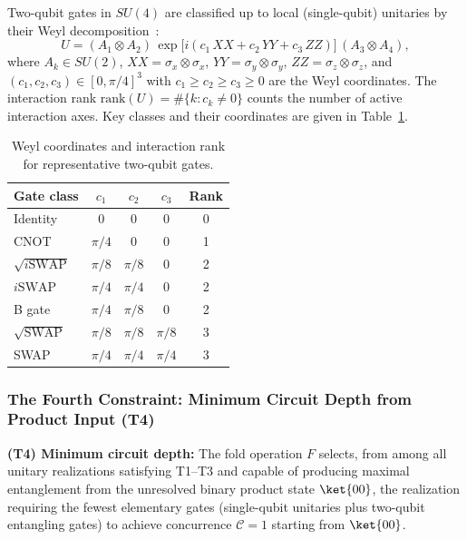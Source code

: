 Two-qubit gates in $SU(4)$ are classified up to local (single-qubit)
unitaries by their Weyl decomposition~\cite{Zhang2003}:
\begin{equation}
    U = (A_1 \otimes A_2)\,
        \exp\!\bigl[i(c_1\,XX + c_2\,YY + c_3\,ZZ)\bigr]\,
        (A_3 \otimes A_4),
    \label{eq:weyl_decomp}
\end{equation}
where $A_k \in SU(2)$, $XX = \sigma_x\otimes\sigma_x$,
$YY = \sigma_y\otimes\sigma_y$, $ZZ = \sigma_z\otimes\sigma_z$,
and $(c_1,c_2,c_3) \in [0,\pi/4]^3$ with $c_1 \geq c_2 \geq c_3 \geq 0$
are the Weyl coordinates. The interaction rank $\mathrm{rank}(U) =
\#\{k: c_k \neq 0\}$ counts the number of active interaction axes.
Key classes and their coordinates are given in Table~\ref{tab:weyl}.

\begin{table}[h]
\centering
\caption{Weyl coordinates and interaction rank for representative two-qubit gates.}
\label{tab:weyl}
\begin{tabular}{lcccc}
\hline
Gate class       & $c_1$    & $c_2$    & $c_3$    & Rank \\
\hline
Identity         & $0$      & $0$      & $0$      & 0 \\
CNOT             & $\pi/4$  & $0$      & $0$      & 1 \\
$\sqrt{i\mathrm{SWAP}}$ & $\pi/8$ & $\pi/8$ & $0$ & 2 \\
$i\mathrm{SWAP}$ & $\pi/4$  & $\pi/4$  & $0$      & 2 \\
B gate           & $\pi/4$  & $\pi/8$  & $0$      & 2 \\
$\sqrt{\mathrm{SWAP}}$ & $\pi/8$ & $\pi/8$ & $\pi/8$ & 3 \\
SWAP             & $\pi/4$  & $\pi/4$  & $\pi/4$  & 3 \\
\hline
\end{tabular}
\end{table}

\subsubsection*{The Fourth Constraint: Minimum Circuit Depth from Product Input (T4)}

\begin{definition}
\label{def:T4}
\textbf{(T4) Minimum circuit depth:}
The fold operation $F$ selects, from among all unitary realizations
satisfying T1--T3 and capable of producing maximal entanglement from
the unresolved binary product state $\ket{00}$, the realization requiring
the fewest elementary gates (single-qubit unitaries plus two-qubit
entangling gates) to achieve concurrence $\mathcal{C} = 1$ starting
from $\ket{00}$.
\end{definition}


